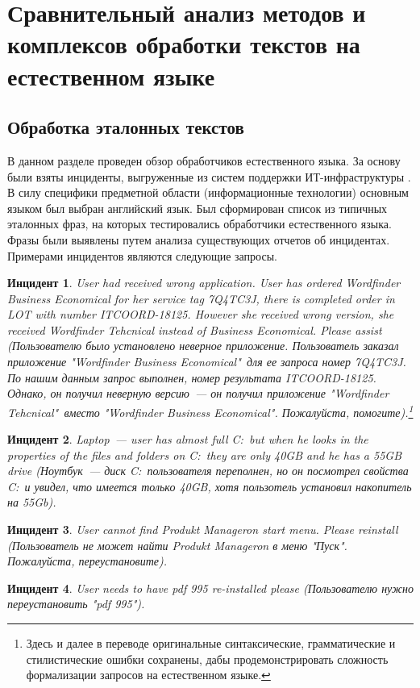 \section{Сравнительный анализ методов и комплексов обработки текстов на естественном языке}


\subsection{Обработка эталонных текстов} \label{sect2_1}
В данном разделе проведен обзор обработчиков естественного языка. За основу были взяты инциденты, выгруженные из систем поддержки ИТ-инфраструктуры \icl. В силу специфики предметной области (информационные технологии) основным языком был выбран английский язык. Был сформирован список из типичных эталонных фраз, на которых тестировались обработчики естественного языка. Фразы были выявлены путем анализа существующих отчетов об инцидентах. Примерами инцидентов являются следующие запросы.\par
\textbf{Инцидент 1}.
\textit{
User had received wrong application. User has ordered Wordfinder Business Economical for her service tag 7Q4TC3J, there is completed order in LOT with number ITCOORD-18125. However she received wrong version, she received Wordfinder Tehcnical instead of Business Economical. Please assist (Пользователю было установлено неверное приложение. Пользователь заказал приложение "Wordfinder Business Economical"\  для ее запроса номер 7Q4TC3J. По нашим данным запрос выполнен, номер результата ITCOORD-18125. Однако, он получил неверную версию~--- он получил приложение "Wordfinder Tehcnical"\  вместо "Wordfinder Business Economical". Пожалуйста, помогите).\footnote{Здесь и далее в переводе оригинальные синтаксические, грамматические и стилистические ошибки сохранены, дабы продемонстрировать сложность формализации запросов на естественном языке.}
}\par
\textbf{Инцидент 2}.
\textit{
Laptop~--- user has almost full C:\ but when he looks in the properties of the files and folders on C:\ they are only 40GB and he has a 55GB drive (Ноутбук~--- диск C:\ пользователя переполнен, но он посмотрел свойства C:\ и увидел, что имеется только 40GB, хотя пользотель установил накопитель на 55Gb).
}\par
\textbf{Инцидент 3}.
\textit{
User cannot find Produkt Manageron start menu. Please reinstall (Пользователь не может найти Produkt Manageron в меню "Пуск". Пожалуйста, переустановите). 
}\par
\textbf{Инцидент 4}.
\textit{
User needs to have pdf 995 re-installed please (Пользователю нужно переустановить "pdf 995").
}\par

